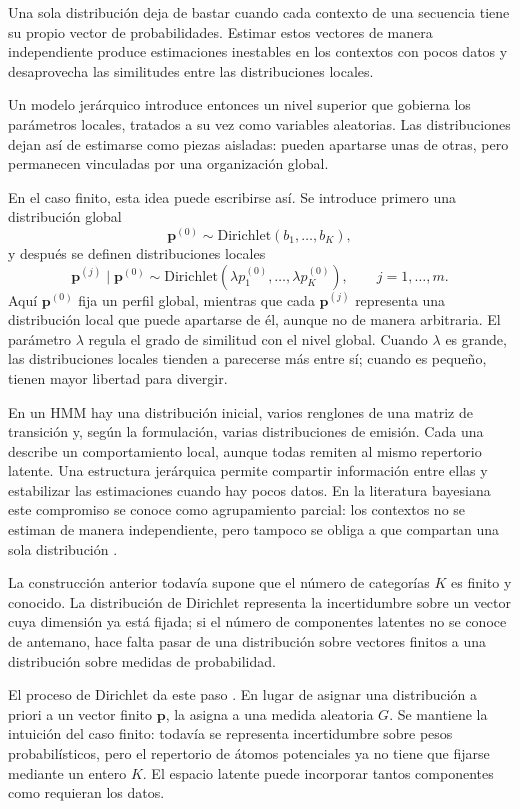 Una sola distribución deja de bastar cuando cada contexto de una secuencia tiene su propio vector de probabilidades. Estimar estos vectores de manera independiente produce estimaciones inestables en los contextos con pocos datos y desaprovecha las similitudes entre las distribuciones locales.

Un modelo jerárquico introduce entonces un nivel superior que gobierna los parámetros locales, tratados a su vez como variables aleatorias. Las distribuciones dejan así de estimarse como piezas aisladas: pueden apartarse unas de otras, pero permanecen vinculadas por una organización global.

En el caso finito, esta idea puede escribirse así. Se introduce primero una distribución global
\[
\mathbf{p}^{(0)}\sim \mathrm{Dirichlet}(b_1,\dots,b_K),
\]
y después se definen distribuciones locales
\[
\mathbf{p}^{(j)}\mid \mathbf{p}^{(0)}
\sim
\mathrm{Dirichlet}(\lambda p^{(0)}_1,\dots,\lambda p^{(0)}_K),
\qquad j=1,\dots,m.
\]
Aquí $\mathbf{p}^{(0)}$ fija un perfil global, mientras que cada $\mathbf{p}^{(j)}$ representa una distribución local que puede apartarse de él, aunque no de manera arbitraria. El parámetro $\lambda$ regula el grado de similitud con el nivel global. Cuando $\lambda$ es grande, las distribuciones locales tienden a parecerse más entre sí; cuando es pequeño, tienen mayor libertad para divergir.

En un HMM hay una distribución inicial, varios renglones de una matriz de transición y, según la formulación, varias distribuciones de emisión. Cada una describe un comportamiento local, aunque todas remiten al mismo repertorio latente. Una estructura jerárquica permite compartir información entre ellas y estabilizar las estimaciones cuando hay pocos datos. En la literatura bayesiana este compromiso se conoce como agrupamiento parcial: los contextos no se estiman de manera independiente, pero tampoco se obliga a que compartan una sola distribución \cite{murphy2012}.

La construcción anterior todavía supone que el número de categorías $K$ es finito y conocido. La distribución de Dirichlet representa la incertidumbre sobre un vector cuya dimensión ya está fijada; si el número de componentes latentes no se conoce de antemano, hace falta pasar de una distribución sobre vectores finitos a una distribución sobre medidas de probabilidad.

El proceso de Dirichlet da este paso \cite{ferguson1973}. En lugar de asignar una distribución a priori a un vector finito $\mathbf{p}$, la asigna a una medida aleatoria $G$. Se mantiene la intuición del caso finito: todavía se representa incertidumbre sobre pesos probabilísticos, pero el repertorio de átomos potenciales ya no tiene que fijarse mediante un entero $K$. El espacio latente puede incorporar tantos componentes como requieran los datos.

